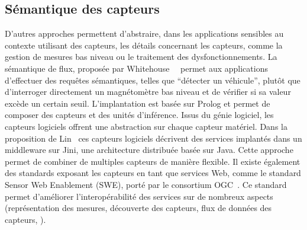 \subsection{Sémantique des capteurs}
D'autres approches permettent d'abstraire, 
dans les applications sensibles au contexte utilisant des capteurs,
les détails concernant les capteurs, comme
la gestion de mesures bas niveau ou le traitement des dysfonctionnements. 
La sémantique de flux, proposée par Whitehouse~\etal~\parencite{whitehouse2006semantic} permet aux 
applications d'effectuer des requêtes sémantiques, telles que 
``détecter un véhicule'', plutôt que d'interroger directement un magnétomètre 
bas niveau et de vérifier si sa valeur excède un certain seuil. L'implantation 
est basée sur Prolog et permet de composer des capteurs et des unités d'inférence.
Issus du génie logiciel, les capteurs logiciels
offrent une abstraction sur chaque capteur matériel. Dans la proposition 
de Lin~\parencite{lin2004software} ces capteurs logiciels décrivent des services 
implantés dans un middleware sur Jini, une architecture distribuée basée sur 
Java. Cette approche permet de combiner de multiples capteurs de manière 
flexible. Il existe également des standards exposant les capteurs en tant que 
services Web, comme le standard Sensor Web Enablement (SWE), porté par le 
consortium OGC~\parencite{botts2008ogc}. Ce standard permet d'améliorer 
l'interopérabilité des services sur de nombreux aspects (représentation des 
mesures, découverte des capteurs, flux de données des capteurs, \etc).
